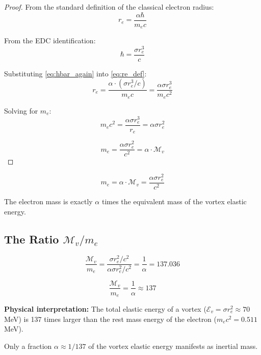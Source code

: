 \documentclass[12pt,a4paper,openany]{book}
\theoremstyle{definition}
\theoremstyle{plain}
\theoremstyle{remark}
\newcommand{\Mv}{\mathcal{M}_v}           %
\newcommand{\Ev}{\mathcal{E}_v}           %
\newcommand{\re}{r_e}                      %
\begin{document}
\begin{proof}
From the standard definition of the classical electron radius:
\begin{equation}
\re = \frac{\alpha \hbar}{m_e c}
\label{eq:re_def}
\end{equation}

From the EDC identification:
\begin{equation}
\hbar = \frac{\sigma \re^3}{c}
\label{eq:hbar_again}
\end{equation}

Substituting \cref{eq:hbar_again} into \cref{eq:re_def}:
\begin{equation}
\re = \frac{\alpha \cdot (\sigma \re^3/c)}{m_e c} = \frac{\alpha \sigma \re^3}{m_e c^2}
\end{equation}

Solving for $m_e$:
\begin{equation}
m_e c^2 = \frac{\alpha \sigma \re^3}{\re} = \alpha \sigma \re^2
\end{equation}

\begin{equation}
m_e = \frac{\alpha \sigma \re^2}{c^2} = \alpha \cdot \Mv
\end{equation}
\end{proof}

\begin{derivedbox}
\begin{equation}
\boxed{m_e = \alpha \cdot \Mv = \frac{\alpha \sigma \re^2}{c^2}}
\end{equation}

The electron mass is exactly $\alpha$ times the equivalent mass of the vortex elastic energy.
\end{derivedbox}

\subsection{The Ratio $\Mv/m_e$}

\begin{equation}
\frac{\Mv}{m_e} = \frac{\sigma \re^2/c^2}{\alpha \sigma \re^2/c^2} = \frac{1}{\alpha} = 137.036
\label{eq:ratio}
\end{equation}

\begin{derivedbox}
\begin{equation}
\boxed{\frac{\Mv}{m_e} = \frac{1}{\alpha} \approx 137}
\end{equation}

\textbf{Physical interpretation:} The total elastic energy of a vortex ($\Ev = \sigma\re^2 \approx 70$ MeV) is 137 times larger than the rest mass energy of the electron ($m_e c^2 = 0.511$ MeV).

Only a fraction $\alpha \approx 1/137$ of the vortex elastic energy manifests as inertial mass.
\end{derivedbox}
\end{document}
